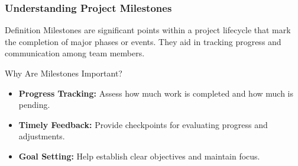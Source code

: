 \documentclass[aspectratio=169]{beamer}
\begin{document}
\begin{frame}[fragile]
    \frametitle{Understanding Project Milestones}
    \begin{block}{Definition}
        Milestones are significant points within a project lifecycle that mark the completion of major phases or events. They aid in tracking progress and communication among team members.
    \end{block}

    \begin{block}{Why Are Milestones Important?}
        \begin{itemize}
            \item \textbf{Progress Tracking:} Assess how much work is completed and how much is pending.
            \item \textbf{Timely Feedback:} Provide checkpoints for evaluating progress and adjustments.
            \item \textbf{Goal Setting:} Help establish clear objectives and maintain focus.
        \end{itemize}
    \end{block}
\end{frame}
\end{document}
